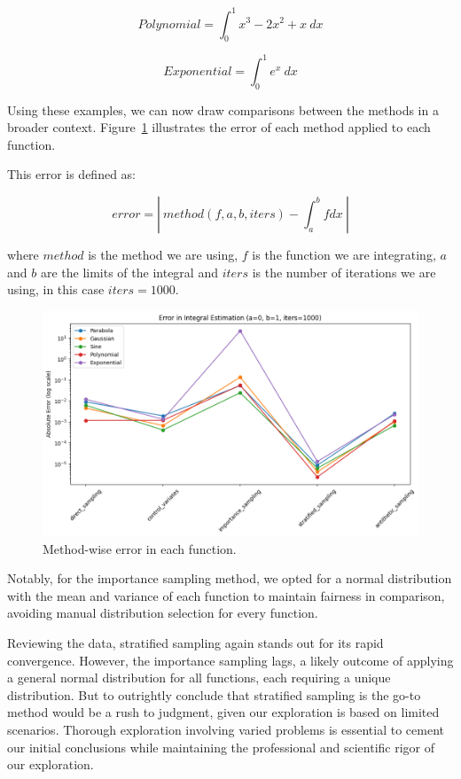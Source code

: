 \documentclass{article}
\begin{document}
\begin{equation} 
	\label{eq:integralvariancereduction4} 
	Polynomial = \int_{0}^{1} x^3 - 2x^2 + x \ dx
\end{equation}

\begin{equation} 
	\label{eq:integralvariancereduction5} 
	Exponential = \int_{0}^{1} e^x \ dx
\end{equation}

Using these examples, we can now draw comparisons between the methods in a broader context. Figure~\ref{fig:comparisonvariancereduction2} illustrates the error of each method applied to each function.

This error is defined as:

\begin{equation*} error = | \ method(f, a, b, iters) - \int_a^b{f dx} \ | \end{equation*}

where \(method\) is the method we are using, \(f\) is the function we are integrating, \(a\) and \(b\) are the limits of the integral and \(iters\) is the number of iterations we are using, in this case \(iters = 1000\).

\begin{figure}[H]
\centering
\includegraphics[width=0.8\linewidth]{./Figures/VarianceReduction/comparisonintegrals.png}
\caption{Method-wise error in each function.}
\label{fig:comparisonvariancereduction2}
\end{figure}

Notably, for the importance sampling method, we opted for a normal distribution with the mean and variance of each function to maintain fairness in comparison, avoiding manual distribution selection for every function.

Reviewing the data, stratified sampling again stands out for its rapid convergence. However, the importance sampling lags, a likely outcome of applying a general normal distribution for all functions, each requiring a unique distribution. But to outrightly conclude that stratified sampling is the go-to method would be a rush to judgment, given our exploration is based on limited scenarios. Thorough exploration involving varied problems is essential to cement our initial conclusions while maintaining the professional and scientific rigor of our exploration.
\end{document}
